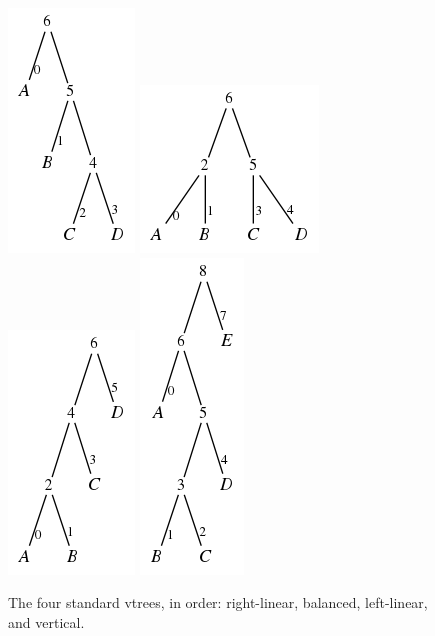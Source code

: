 \documentclass[11pt]{report}
\begin{document}
\begin{figure}
\centering
\includegraphics[scale=0.4]{rightlinearABCD.png}
\quad
\includegraphics[scale=0.4]{balancedABCD.png}
\quad
\includegraphics[scale=0.4]{leftlinearABCD.png}
\quad
\includegraphics[scale=0.4]{verticalABCDE.png}
\caption{The four standard vtrees, in order: right-linear, balanced, left-linear, and vertical.}
\label{fig:std_vtrees_example}
\end{figure}
\end{document}
